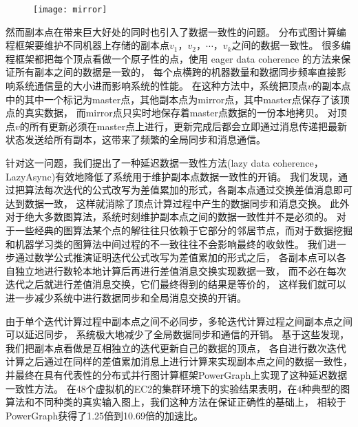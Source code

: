 \begin{figure}[!htbp]
  \centering
  \texttt{[image: mirror]}
  \label{fig:mirror}
\end{figure}

然而副本点在带来巨大好处的同时也引入了数据一致性的问题。
分布式图计算编程框架要维护不同机器上存储的副本点$v_1，v_2，\cdots，v_k$之间的数据一致性。
很多编程框架都把每个顶点看做一个原子性的点，使用 eager data coherence 的方法来保证所有副本之间的数据是一致的，
每个点横跨的机器数量和数据同步频率直接影响系统通信量的大小进而影响系统的性能。
在这种方法中，系统把顶点$v$的副本点中的其中一个标记为master点，其他副本点为mirror点，其中master点保存了该顶点的真实数据，
而mirror点只实时地保存着master点数据的一份本地拷贝。
对顶点$v$的所有更新必须在master点上进行，更新完成后都会立即通过消息传递把最新状态发送给所有副本，这带来了频繁的全局同步和消息通信。

针对这一问题，我们提出了一种延迟数据一致性方法(lazy data coherence，LazyAsync)\cite{Wang@PPoPP18}有效地降低了系统用于维护副本点数据一致性的开销。
我们发现，通过把算法每次迭代的公式改写为差值累加的形式，各副本点通过交换差值消息即可达到数据一致，
这样就消除了顶点计算过程中产生的数据同步和消息交换。
此外对于绝大多数图算法，系统时刻维护副本点之间的数据一致性并不是必须的。
对于一些经典的图算法某个点的解往往只依赖于它部分的邻居节点，而对于数据挖掘和机器学习类的图算法中间过程的不一致往往不会影响最终的收敛性。
我们进一步通过数学公式推演证明迭代公式改写为差值累加的形式之后，
各副本点可以各自独立地进行数轮本地计算后再进行差值消息交换实现数据一致，
而不必在每次迭代之后就进行差值消息交换，它们最终得到的结果是等价的，
这样我们就可以进一步减少系统中进行数据同步和全局消息交换的开销。

由于单个迭代计算过程中副本点之间不必同步，多轮迭代计算过程之间副本点之间可以延迟同步，
系统极大地减少了全局数据同步和通信的开销。
基于这些发现，我们把副本点看做是互相独立的迭代更新自己的数据的顶点，
  各自进行数次迭代计算之后通过在同样的差值累加消息上进行计算来实现副本点之间的数据一致性，
并最终在具有代表性的分布式并行图计算框架PowerGraph\cite{Gonzalez@OSDI12}上实现了这种延迟数据一致性方法。
在48个虚拟机的EC2的集群环境下的实验结果表明，在4种典型的图算法和不同种类的真实输入图上，我们这种方法在保证正确性的基础上，
相较于PowerGraph获得了1.25倍到10.69倍的加速比。



